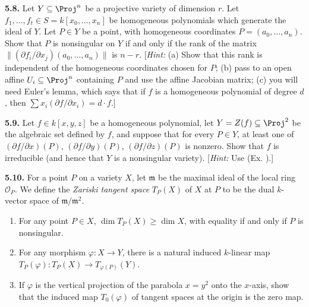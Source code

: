 {\smallskip
\noindent\hypertarget{ex-I-5.8}{}\textbf{5.8.} Let $Y\subseteq\Proj^n$ be a projective variety of dimension $r$. Let $f_1,\ldots,f_t\in S=k[x_0,\ldots,x_n]$ be homogeneous polynomials which generate the ideal of $Y$. Let $P\in Y$ be a point, with homogeneous coordinates $P=(a_0,\ldots,a_n)$. Show that $P$ is nonsingular on $Y$ if and only if the rank of the matrix $\lVert(\partial f_i/\partial x_j)(a_0,\ldots,a_n)\rVert$ is $n-r$. [\emph{Hint:} (a) Show that this rank is independent of the homogeneous coordinates chosen for $P$; (b) pass to an open affine $U_i\subseteq\Proj^n$ containing $P$ and use the affine Jacobian matrix; (c) you will need Euler's lemma, which says that if $f$ is a homogeneous polynomial of degree $d$, then $\sum x_i(\partial f/\partial x_i)=d\cdot f$.]

\smallskip
\noindent\hypertarget{ex-I-5.9}{}\hypertarget{err-I-5-9}{}\textbf{5.9.} Let $f\in k[x,y,z]$ be a homogeneous polynomial\EditionText{}, let $Y=Z(f)\subseteq\Proj^2$ be the algebraic set defined by $f$, and suppose that for every $P\in Y$, at least one of $(\partial f/\partial x)(P)$, $(\partial f/\partial y)(P)$, $(\partial f/\partial z)(P)$ is nonzero. Show that $f$ is irreducible (and hence that $Y$ is a nonsingular variety). [\emph{Hint:} Use (Ex. ).]

\smallskip
\noindent\hypertarget{ex-I-5.10}{}\textbf{5.10.} For a point $P$ on a variety $X$, let $\mathfrak m$ be the maximal ideal of the local ring $\mathcal O_P$. We define the \emph{Zariski tangent space} $T_P(X)$ of $X$ at $P$ to be the dual $k$-vector space of $\mathfrak m/\mathfrak m^2$.
\begin{enumerate}[label=(\alph*),leftmargin=2.4em,nosep]
\item For any point $P\in X$, $\dim T_P(X)\ge\dim X$, with equality if and only if $P$ is nonsingular.
\item For any morphism $\varphi\colon X\to Y$, there is a natural induced $k$-linear map $T_P(\varphi)\colon T_P(X)\to T_{\varphi(P)}(Y)$.
\item If $\varphi$ is the vertical projection of the parabola $x=y^2$ onto the $x$-axis, show that the induced map $T_0(\varphi)$ of tangent spaces at the origin is the zero map.
\end{enumerate}}
